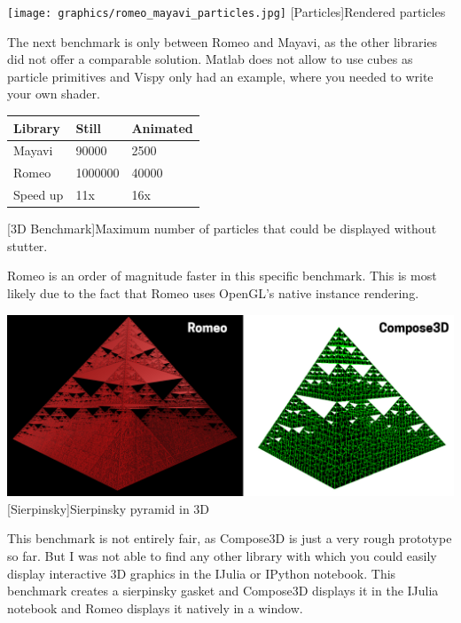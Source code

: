 \begin{minipage}{\linewidth}
    \centering
    \texttt{[image: graphics/romeo\_mayavi\_particles.jpg]}
    [Particles]{Rendered particles}
    \label{fig:reactive1}
\end{minipage}

The next benchmark is only between Romeo and Mayavi, as the other libraries did not offer a comparable solution. Matlab does not allow to use cubes as particle primitives and Vispy only had an example, where you needed to write your own shader.

\begin{table}[htbp]
    \centering
    \begin{tabular}{l|l|l}
        \hline
        \textbf{Library} & \textbf{Still}  & \textbf{Animated}  \\ 
        \hline
        Mayavi           & 90000           & 2500  \\
        Romeo            & 1000000         & 40000 \\
        \hline
        \hline
        Speed up         & 11x             & 16x \\
    \end{tabular}
    [3D Benchmark]{Maximum number of particles that could be displayed without stutter.}
    \label{table:relativespeedoglw}
\end{table}
Romeo is an order of magnitude faster in this specific benchmark. This is most likely due to the fact that Romeo uses OpenGL's native instance rendering.

\begin{minipage}{\linewidth}
    \centering
    \includegraphics[width=\linewidth]{graphics/sierpinsky.jpg}
    [Sierpinsky]{Sierpinsky pyramid in 3D}
    \label{fig:reactive1}
\end{minipage}

This benchmark is not entirely fair, as Compose3D is just a very rough prototype so far. But I was not able to find any other library with which you could easily display interactive 3D graphics in the IJulia or IPython notebook. This benchmark creates a sierpinsky gasket and Compose3D displays it in the IJulia notebook and Romeo displays it natively in a window.

